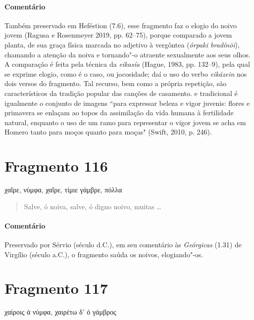 {{\paragraph{Comentário} Também preservado em Heféstion (7.6), esse fragmento faz o elogio do noivo jovem (Ragusa e Rosenmeyer 2019, pp. 62--75), porque comparado a jovem planta, de sua
graça física marcada no adjetivo à vergôntea (\textit{órpaki bradínōi}), chamando a atenção da noiva e tornando"-o atraente sexualmente aos seus olhos.
A comparação é feita pela técnica da \textit{eikasía} (Hague, 1983, pp. 132--9), pela qual se exprime elogio, como é o caso, ou jocosidade; daí o uso do verbo \textit{eikázein} nos dois versos do fragmento. Tal recurso, bem como a própria repetição, são característicos da tradição popular das canções de casamento. e tradicional é igualmente o conjunto de imagens “para expressar beleza e vigor juvenis: flores e primavera se enlaçam ao topos da assimilação da vida humana à fertilidade natural, enquanto o uso de um ramo para representar o vigor jovem se acha em Homero tanto para moços quanto para moças" (Swift, 2010, p. 246). }

\pagebreak
\section{Fragmento 116}

\begin{gkverse}
χαῖρε, νύμφα, χαῖρε, τίμιε γάμβρε, πόλλα
\end{gkverse}

\begin{verse}
Salve, ó noiva, salve, ó digno noivo, muitas \ldots{}
\end{verse}

{\paragraph{Comentário} Preservado por Sérvio (século  d.C.), em seu comentário às \textit{Geórgicas} (1.31) de Virgílio (século  a.C.), o fragmento saúda os noivos, elogiando"-os.}


\section{Fragmento 117}

\begin{gkverse}
\dagger{}χαίροις ἀ νύμφα\dagger{}, χαιρέτω δ’ ὀ γάμβρος
\end{gkverse}

}
